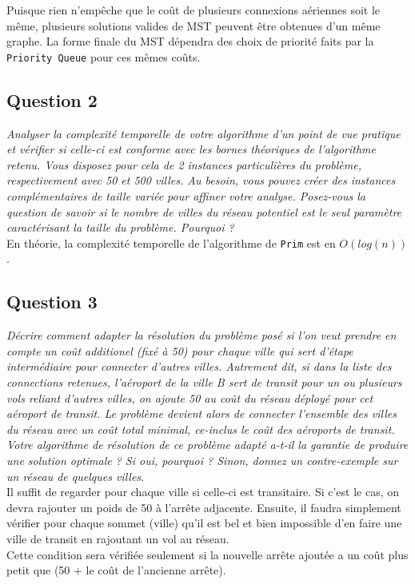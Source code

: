 \documentclass[11pt]{article}
\begin{document}
Puisque rien n'empêche que le coût de plusieurs connexions aériennes soit le même, plusieurs solutions valides de MST peuvent être obtenues d'un même graphe. La forme finale du MST dépendra des choix de priorité faits par la \verb+Priority Queue+ pour ces mêmes coûts.

\subsection*{Question 2}
\textit{Analyser la complexité temporelle de votre algorithme d’un point de vue pratique et vérifier si celle-ci est conforme avec les bornes théoriques de l’algorithme retenu. Vous disposez pour cela de 2 instances particulières du problème, respectivement avec 50 et 500 villes. Au besoin, vous pouvez créer des instances complémentaires de taille variée pour affiner votre analyse. Posez-vous la question de savoir si le nombre de villes du réseau potentiel est le seul paramètre caractérisant la taille du problème. Pourquoi ?} \\

En théorie, la complexité temporelle de l'algorithme de \verb+Prim+ est en $O(log(n))$.

\subsection*{Question 3}
\textit{Décrire comment adapter la résolution du problème posé si l’on veut prendre en compte un coût additionel (fixé à 50) pour chaque ville qui sert d’étape intermédiaire pour connecter d’autres villes. Autrement dit, si dans la liste des connections retenues, l’aéroport de la ville B sert de transit pour un ou plusieurs vols reliant d’autres villes, on ajoute 50 au coût du réseau déployé pour cet aéroport de transit. Le problème devient alors de connecter l’ensemble des villes du réseau avec un coût total minimal, ce-inclus le coût des aéroports de transit. Votre algorithme de résolution de ce problème adapté a-t-il la garantie de produire une solution optimale ? Si oui, pourquoi ? Sinon, donnez un contre-exemple sur un réseau de quelques villes.} \\ 

Il suffit de regarder pour chaque ville si celle-ci est transitaire. Si c'est le cas, on devra rajouter un poids de 50 à l'arrête adjacente. Ensuite, il faudra simplement vérifier pour chaque sommet (ville) qu'il est bel et bien impossible d'en faire une ville de transit en rajoutant un vol au réseau. \\
Cette condition sera vérifiée seulement si la nouvelle arrête ajoutée a un coût plus petit que (50 $+$ le coût de l'ancienne arrête).
\end{document}
